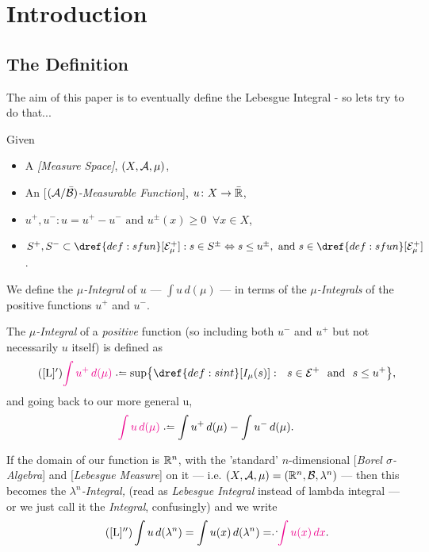 \section{Introduction}
%
%
\subsection{The Definition}\label{def:main}
The aim of this paper is to eventually define the Lebesgue Integral - so lets try to do that...
\begin{definition}
	Given
%
	\begin{itemize}
		\item A \emph{[Measure Space]}, $(X, \mathcal{A}, \mu)$,
		\item An [$(\mathcal{A}/\bar {\mathcal{B}})$\emph{-Measurable Function}], $u\colon X \rightarrow \bar {\mathbb{R}}$,
		\item $u^+, u^- : u = u^+ - u^- \text{ and }u^{\pm}(x) \geq 0 \;\; \forall x \in X$,  
		\item $S^+, S^- \subset \dref{def:sfun}[\E_\mu^+] : s \in S^{\pm} \Leftrightarrow s \leq u^{\pm}, \text{ and } s \in \dref{def:sfun}[\E^+_\mu]$.
	\end{itemize}
%
	We define the {\color{Magenta}\emph{$\mu$-Integral}} of $u$ --- $\int u\,d(\mu)$ --- in terms of the {\color{Magenta}\emph{$\mu$-Integrals}}
	of the positive functions $u^+$ and $u^-$. 

	The {\color{Magenta}\emph{$\mu$-Integral}} of a {\em positive} function (so including both $u^-$ and $u^+$ but not necessarily $u$ itself) is defined as
%
	\begin{equation*}\label{posint}\tag{\ref{L}$'$}
	{\color{Magenta}\int u^+\,d(\mu)} \defeq \sup\bigr\{ \dref{def:sint}[I_\mu(s)] : \ \  s \in \E^+ \text{ \ and \ } s \le u^+ \bigl\},
	\end{equation*}
%
	and going back to our more general u, 
%
	\begin{equation}\label{L}
	{\color{Magenta}\int u\,d(\mu)} \defeq \int u^+\,d(\mu) - \int u^-\,d(\mu).
	\end{equation}

	If the domain of our function is $\mathbb{R}^n$, with the 'standard' $n$-dimensional [\emph{Borel $\sigma$-Algebra}] and 
	[\emph{Lebesgue Measure}] on it --- i.e. $(X, \mathcal{A}, \mu) = (\mathbb{R}^n, \mathcal{B}, \lambda^n)$ --- then this becomes the {\color{Magenta}\emph{$\lambda^n$-Integral,}}
	 (read as {\it \color{Magenta}Lebesgue Integral} instead of lambda integral --- or we just call it the {\color{Magenta}\emph{Integral}}, confusingly) and we write
%
	\begin{equation*} \tag{\ref{L}$''$}
	\int u\,d(\lambda^n) =  \int u(x)\,d(\Ln) \eqdef {\color{Magenta}\int u(x)\,dx}. 
	\end{equation*}
	\vskip 5pt
\end{definition}

